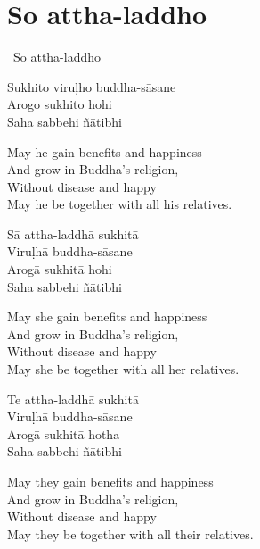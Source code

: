 \suttaRef{[AN 5.36]}

\section{So attha-laddho}
\label{so-attha-laddho}

\begin{pali-leader}
  \anglebracketleft\ \hspace{-0.5mm}So attha-laddho \hspace{-0.5mm}\anglebracketright\
\end{pali-leader}
\begin{pali-hangtogether}
  Sukhito viruḷho buddha-sāsane\\
  Arogo sukhito hohi\\
  Saha sabbehi ñātibhi
\end{pali-hangtogether}

\begin{english-verses}
  May he gain benefits and happiness\\
  And grow in Buddha's religion,\\
  Without disease and happy\\
  May he be together with all his relatives.
\end{english-verses}

\begin{pali-hang}
  Sā attha-laddhā sukhitā\\
  Viruḷhā buddha-sāsane\\
  Arogā sukhitā hohi\\
  Saha sabbehi ñātibhi
\end{pali-hang}

\begin{english-verses}
  May she gain benefits and happiness\\
  And grow in Buddha's religion,\\
  Without disease and happy\\
  May she be together with all her relatives.
\end{english-verses}

\begin{pali-hang}
  Te attha-laddhā sukhitā\\
  Viruḷhā buddha-sāsane\\
  Arogā sukhitā hotha\\
  Saha sabbehi ñātibhi
\end{pali-hang}

\begin{english-verses}
  May they gain benefits and happiness\\
  And grow in Buddha's religion,\\
  Without disease and happy\\
  May they be together with all their relatives.
\end{english-verses}

\suttaRef{[AN 3.155]}

